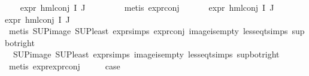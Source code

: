 \begin{isabellebody}
\ \ \isamarkupfalse%
\ {\isachardoublequoteopen}expr{\isacharunderscore}{\kern0pt}{}\ {\isacharparenleft}{\kern0pt}hml{\isacharunderscore}{\kern0pt}conj\ I\ J\ {\isasymPhi}{\isacharparenright}{\kern0pt}\ {\isasymle}\ {}{\isachardoublequoteclose}\isanewline
\ \ \ \ \isamarkupfalse%
\ {\isacharparenleft}{\kern0pt}metis\ expr{\isacharunderscore}{\kern0pt}{}{\isacharunderscore}{\kern0pt}conj{\isacharparenright}{\kern0pt}\isanewline
\ \ \isamarkupfalse%
\ {}\ \isamarkupfalse%
\ {\isachardoublequoteopen}expr{\isacharunderscore}{\kern0pt}{}\ {\isacharparenleft}{\kern0pt}hml{\isacharunderscore}{\kern0pt}conj\ I\ J\ {\isasymPhi}{\isacharparenright}{\kern0pt}\ {\isacharless}{\kern0pt}{\isacharequal}{\kern0pt}\ {}{\isachardoublequoteclose}\isanewline
{\isachardoublequoteopen}expr{\isacharunderscore}{\kern0pt}{}\ {\isacharparenleft}{\kern0pt}hml{\isacharunderscore}{\kern0pt}conj\ I\ J\ {\isasymPhi}{\isacharparenright}{\kern0pt}\ {\isacharless}{\kern0pt}{\isacharequal}{\kern0pt}\ {}{\isachardoublequoteclose}\isanewline
\ \ \ \ \ \isamarkupfalse%
\ {\isacharparenleft}{\kern0pt}metis\ SUP{\isacharunderscore}{\kern0pt}image\ SUP{\isacharunderscore}{\kern0pt}least\ expr{\isachardot}{\kern0pt}simps\ expr{\isacharunderscore}{\kern0pt}{}{\isacharunderscore}{\kern0pt}conj\ image{\isacharunderscore}{\kern0pt}is{\isacharunderscore}{\kern0pt}empty\ less{\isacharunderscore}{\kern0pt}eq{\isacharunderscore}{\kern0pt}t{\isachardot}{\kern0pt}simps\ sup{\isacharunderscore}{\kern0pt}bot{\isacharunderscore}{\kern0pt}right{\isacharparenright}{\kern0pt}\isanewline
\ \ \ \ \isamarkupfalse%
\ {}\ SUP{\isacharunderscore}{\kern0pt}image\ SUP{\isacharunderscore}{\kern0pt}least\ expr{\isachardot}{\kern0pt}simps\ image{\isacharunderscore}{\kern0pt}is{\isacharunderscore}{\kern0pt}empty\ less{\isacharunderscore}{\kern0pt}eq{\isacharunderscore}{\kern0pt}t{\isachardot}{\kern0pt}simps\ sup{\isacharunderscore}{\kern0pt}bot{\isacharunderscore}{\kern0pt}right\isanewline
\ \ \ \ \isamarkupfalse%
\ {\isacharparenleft}{\kern0pt}metis\ expr{\isacharunderscore}{\kern0pt}{}{\isachardot}{\kern0pt}expr{\isacharunderscore}{\kern0pt}{}{\isacharunderscore}{\kern0pt}conj{\isacharparenright}{\kern0pt}\isanewline
\ \ \isamarkupfalse%
\ \isamarkupfalse%
\ {\isacharquery}{\kern0pt}case\ \isanewline
\ \ \ \ \isamarkupfalse%

\end{isabellebody}
